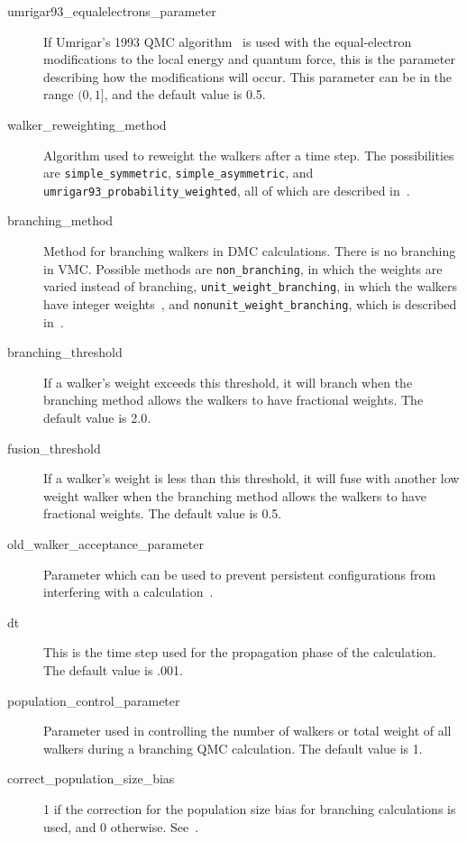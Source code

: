 \documentclass[11pt]{article}
\begin{document}
\begin{description}
\item [umrigar93\_equalelectrons\_parameter] If Umrigar's 1993 QMC
  algorithm~\cite{UmrigarNightingaleRunge1993} is used with the equal-electron
  modifications to the local energy and quantum force, this is the
  parameter describing how the modifications will occur.  This
  parameter can be in the range $(0,1]$, and the default value is 0.5.

\item [walker\_reweighting\_method] Algorithm used to reweight the
  walkers after a time step.  The possibilities are
  \verb-simple_symmetric-, \verb-simple_asymmetric-, and
  \verb-umrigar93_probability_weighted-, all of which are described
  in~\cite{UmrigarNightingaleRunge1993}. 

\item [branching\_method] Method for branching walkers in DMC
  calculations.  There is no branching in VMC.  Possible
  methods are \verb-non_branching-, in which the weights are varied
  instead of branching, \verb-unit_weight_branching-, in which the
  walkers have integer weights~\cite{H+L}, and
  \verb-nonunit_weight_branching-, which is described
  in~\cite{UmrigarNightingaleRunge1993}.   

\item [branching\_threshold] If a walker's weight exceeds this
  threshold, it will branch when the branching method allows the
  walkers to have fractional weights.  The default value is 2.0.

\item [fusion\_threshold] If a walker's weight is less than this
  threshold, it will fuse with another low weight walker when the
  branching method allows the walkers to have fractional weights.  The
  default value is 0.5.

\item [old\_walker\_acceptance\_parameter] Parameter which can be
  used to prevent persistent configurations from interfering with a
  calculation~\cite{UmrigarNightingaleRunge1993}.

\item [dt] This is the time step used for the propagation phase
  of the calculation.  The default value is .001.

\item [population\_control\_parameter] Parameter used in
  controlling the number of walkers or total weight of all walkers
  during a branching QMC calculation.  The default value is 1.

\item [correct\_population\_size\_bias] 1 if the correction for the
  population size bias for branching calculations is used, and 0
  otherwise. See~\cite{UmrigarNightingaleRunge1993}.

\end{description}
\end{document}
